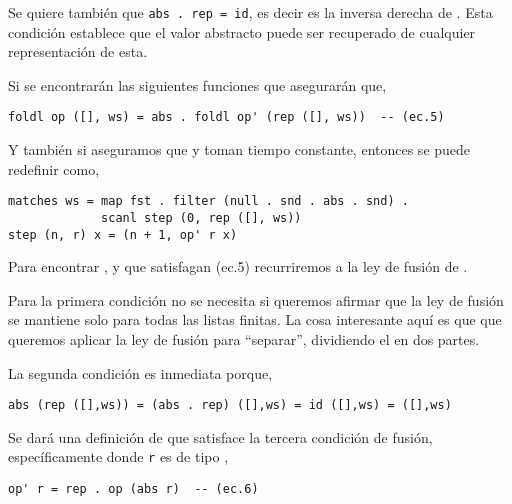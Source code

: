 Se quiere también que \texttt{abs . rep = id}, es decir  es la inversa derecha de
. Esta condición establece que el valor abstracto puede ser recuperado de cualquier
representación de esta.

Si se encontrarán las siguientes funciones que asegurarán que, %
\begin{verbatim}
foldl op ([], ws) = abs . foldl op' (rep ([], ws))  -- (ec.5)
\end{verbatim}

Y también si aseguramos que  y  toman tiempo constante, entonces se puede
redefinir  como,

\begin{verbatim}
matches ws = map fst . filter (null . snd . abs . snd) .
             scanl step (0, rep ([], ws))
step (n, r) x = (n + 1, op' r x)    
\end{verbatim}

Para encontrar ,  y  que satisfagan (ec.5) recurriremos a la ley de fusión de .

Para la primera condición no se necesita si queremos afirmar que la ley de fusión se mantiene solo para todas las listas finitas.
La cosa interesante aquí es que que queremos aplicar la ley de fusión para ``separar'', dividiendo el  en dos partes.

La segunda condición es inmediata porque,
\begin{verbatim}
abs (rep ([],ws)) = (abs . rep) ([],ws) = id ([],ws) = ([],ws)
\end{verbatim}

Se dará una definición de  que satisface la tercera condición de fusión,
específicamente donde \texttt{r} es de tipo ,
\begin{verbatim}
op' r = rep . op (abs r)  -- (ec.6)
\end{verbatim}

